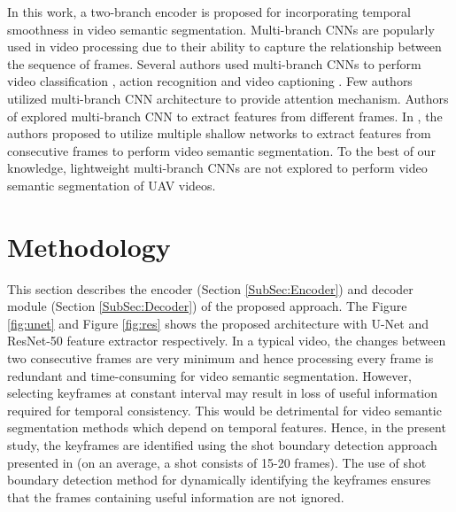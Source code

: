\documentclass[journal]{IEEEtran}
\begin{document}
In this work, a two-branch encoder is proposed for incorporating temporal smoothness in video semantic segmentation. Multi-branch CNNs are popularly used in video processing due to their ability to capture the relationship between the sequence of frames. Several authors used multi-branch CNNs to perform video classification \cite{wang2018appearance}, action recognition \cite{peng2016multi} and video captioning \cite{yu2016video}. Few authors utilized multi-branch CNN architecture to provide attention mechanism. Authors of \cite{qiao2016deep} explored multi-branch CNN to extract features from different frames. In \cite{hu2020temporally}, the authors proposed to utilize multiple shallow networks to extract features from consecutive frames to perform video semantic segmentation. To the best of our knowledge, lightweight multi-branch CNNs are not explored to perform video semantic segmentation of UAV videos.  

\section{Methodology}
\label{sec:methodology}


\par This section describes the encoder (Section \ref{SubSec:Encoder}) and decoder module (Section \ref{SubSec:Decoder}) of the proposed approach.  The Figure \ref{fig:unet} and  Figure \ref{fig:res} shows the proposed architecture with U-Net and ResNet-50 feature extractor respectively. In a typical video, the changes between two consecutive frames are very minimum and hence processing every frame is redundant and time-consuming for video semantic segmentation. However,  selecting keyframes at constant interval may result in loss of useful information required for temporal consistency. This would be detrimental for video semantic segmentation methods which depend on temporal features. Hence, in the present study, the keyframes are identified using the shot boundary detection approach presented in \cite{19} (on an average, a shot consists of 15-20 frames). The use of shot boundary detection method for dynamically identifying the keyframes ensures that the frames containing useful information are not ignored.
\end{document}
